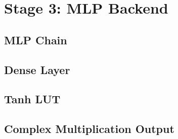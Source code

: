 \documentclass[a4paper,12pt]{article}
\begin{document}
\section{Stage 3: MLP Backend}


\subsection{MLP Chain}


\subsection{Dense Layer}


\subsection{Tanh LUT}


\subsection{Complex Multiplication Output}

\end{document}

